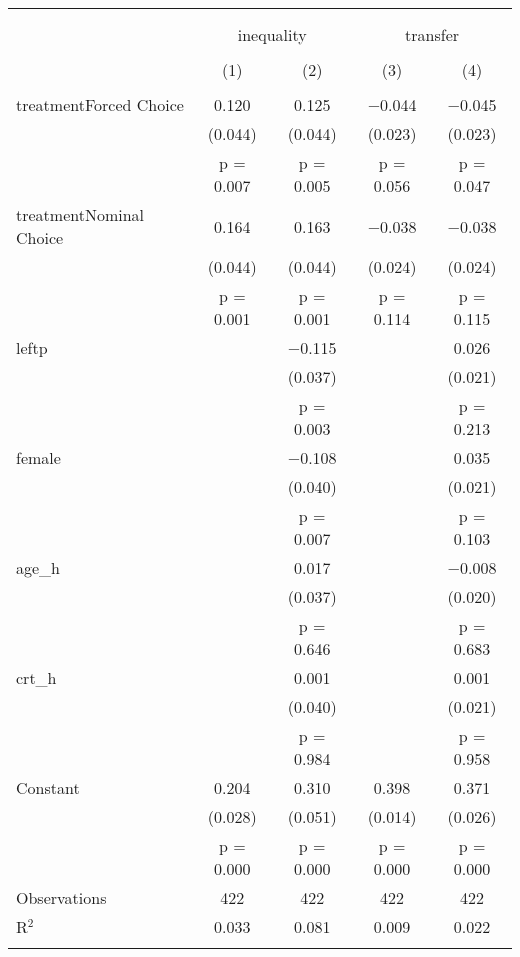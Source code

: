 
\begin{table}[!htbp] \centering 
  \caption{} 
  \label{tbl:o:trans} 
\begin{tabular}{@{\extracolsep{5pt}}lcccc} 
\\[-1.0ex]\hline 
\hline \\[-1.0ex] 
\\[-1.0ex] & \multicolumn{2}{c}{inequality} & \multicolumn{2}{c}{transfer} \\ 
\\[-1.0ex] & (1) & (2) & (3) & (4)\\ 
\hline \\[-1.0ex] 
 treatmentForced Choice & 0.120 & 0.125 & $-$0.044 & $-$0.045 \\ 
  & (0.044) & (0.044) & (0.023) & (0.023) \\ 
  & p = 0.007 & p = 0.005 & p = 0.056 & p = 0.047 \\ 
 treatmentNominal Choice & 0.164 & 0.163 & $-$0.038 & $-$0.038 \\ 
  & (0.044) & (0.044) & (0.024) & (0.024) \\ 
  & p = 0.001 & p = 0.001 & p = 0.114 & p = 0.115 \\ 
 leftp &  & $-$0.115 &  & 0.026 \\ 
  &  & (0.037) &  & (0.021) \\ 
  &  & p = 0.003 &  & p = 0.213 \\ 
 female &  & $-$0.108 &  & 0.035 \\ 
  &  & (0.040) &  & (0.021) \\ 
  &  & p = 0.007 &  & p = 0.103 \\ 
 age\_h &  & 0.017 &  & $-$0.008 \\ 
  &  & (0.037) &  & (0.020) \\ 
  &  & p = 0.646 &  & p = 0.683 \\ 
 crt\_h &  & 0.001 &  & 0.001 \\ 
  &  & (0.040) &  & (0.021) \\ 
  &  & p = 0.984 &  & p = 0.958 \\ 
 Constant & 0.204 & 0.310 & 0.398 & 0.371 \\ 
  & (0.028) & (0.051) & (0.014) & (0.026) \\ 
  & p = 0.000 & p = 0.000 & p = 0.000 & p = 0.000 \\ 
Observations & 422 & 422 & 422 & 422 \\ 
R$^{2}$ & 0.033 & 0.081 & 0.009 & 0.022 \\ 
\hline \\[-1.0ex] 
\end{tabular} 
\end{table}  
